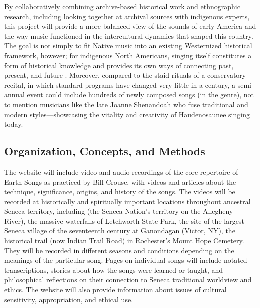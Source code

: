 \documentclass{neh}
\begin{document}
By collaboratively combining archive-based historical work and ethnographic
research, including looking together at archival sources with indigenous
experts, this project will provide a more balanced view of the sounds of early
America and the way music functioned in the intercultural dynamics that
shaped this country.
The goal is not simply to fit Native music into an existing Westernized
historical framework, however; for indigenous North Americans, singing itself
constitutes a form of historical knowledge and provides its own ways of
connecting past, present, and future
\Autocite{Diamond:NativeAmericanHistory}.
Moreover, compared to the staid rituals of a conservatory recital, in which
standard programs have changed very little in a century, a semi-annual
 event could include hundreds of newly composed songs (in the
 genre), not to mention musicians like the late Joanne
Shenandoah who fuse traditional and modern styles---showcasing the vitality
and creativity of Haudenosaunee singing today.

 
\subsection{Organization, Concepts, and Methods}



The website will include video and audio recordings of the core repertoire of
Earth Songs as practiced by Bill Crouse, with videos and articles about the
technique, significance, origins, and history of the songs.
The videos will be recorded at historically and spiritually important
locations throughout ancestral Seneca territory, including 
(the Seneca Nation's territory on the Allegheny River), the massive waterfalls
of Letchworth State Park, the site of the largest Seneca village of the
seventeenth century at Ganondagan (Victor, NY), the historical trail (now
Indian Trail Road) in Rochester's Mount Hope Cemetery.
They will be recorded in different seasons and conditions depending on the
meanings of the particular song.
Pages on individual songs will include notated transcriptions, stories about
how the songs were learned or taught, and philosophical reflections on their
connection to Seneca traditional worldview and ethics.
The website will also provide information about issues of cultural
sensitivity, appropriation, and ethical use.
\end{document}
